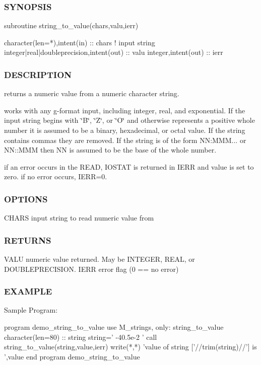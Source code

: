 \subsubsection*{S\+Y\+N\+O\+P\+S\+IS}

\begin{DoxyVerb}subroutine string_to_value(chars,valu,ierr)

 character(len=*),intent(in)              :: chars   ! input string
 integer|real|doubleprecision,intent(out) :: valu
 integer,intent(out)                      :: ierr
\end{DoxyVerb}
 \subsubsection*{D\+E\+S\+C\+R\+I\+P\+T\+I\+ON}

returns a numeric value from a numeric character string.

works with any g-\/format input, including integer, real, and exponential. If the input string begins with \char`\"{}\+B\char`\"{}, \char`\"{}\+Z\char`\"{}, or \char`\"{}\+O\char`\"{} and otherwise represents a positive whole number it is assumed to be a binary, hexadecimal, or octal value. If the string contains commas they are removed. If the string is of the form NN\+:M\+MM... or N\+N\+::\+M\+MM then NN is assumed to be the base of the whole number.

if an error occurs in the R\+E\+AD, I\+O\+S\+T\+AT is returned in I\+E\+RR and value is set to zero. if no error occurs, I\+E\+RR=0. \subsubsection*{O\+P\+T\+I\+O\+NS}

C\+H\+A\+RS input string to read numeric value from \subsubsection*{R\+E\+T\+U\+R\+NS}

V\+A\+LU numeric value returned. May be I\+N\+T\+E\+G\+ER, R\+E\+AL, or D\+O\+U\+B\+L\+E\+P\+R\+E\+C\+I\+S\+I\+ON. I\+E\+RR error flag (0 == no error) \subsubsection*{E\+X\+A\+M\+P\+LE}

\begin{DoxyVerb}Sample Program:

 program demo_string_to_value
 use M_strings, only: string_to_value
 character(len=80) :: string
    string=' -40.5e-2 '
    call string_to_value(string,value,ierr)
    write(*,*) 'value of string ['//trim(string)//'] is ',value
 end program demo_string_to_value
\end{DoxyVerb}
